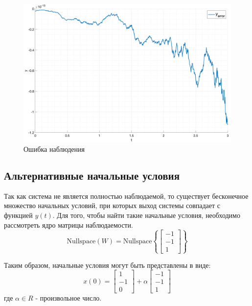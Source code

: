 \begin{figure}
    \centering
    \includegraphics[width=\textwidth]{media/plots/task4_error.png}
    \caption{Ошибка наблюдения}
    \label{fig:task4_estimation}
\end{figure}

\FloatBarrier
\subsection{Альтернативные начальные условия} 
Так как система не является полностью наблюдаемой, то существует бесконечное множество начальных условий,
при которых выход системы совпадает с функцией $y(t)$. Для того, чтобы найти такие начальные условия, необходимо
рассмотреть ядро матрицы наблюдаемости.
\begin{equation}
    \text{Nullspace}(W) =  \text{Nullspace}\left\{\begin{bmatrix}
        -1 \\ -1 \\ 1
    \end{bmatrix}  \right\}
\end{equation}

Таким образом, начальные условия могут быть представлены в виде: 
\begin{equation}
    x(0) = \begin{bmatrix}
        1 \\ -1 \\ 0
    \end{bmatrix} + \alpha \begin{bmatrix}
        -1 \\ -1 \\ 1
    \end{bmatrix}
\end{equation}
где $\alpha \in R$ - произвольное число.

